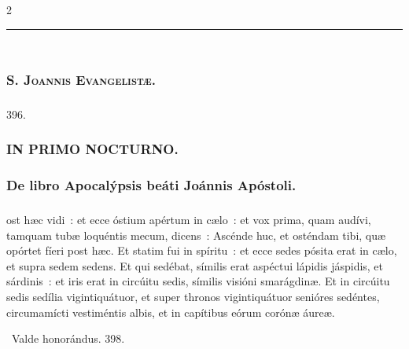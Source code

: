 \documentclass[9pt,twoside]{extarticle}
\begin{document}
\begin{multicols}{2}
\begin{center}\textcolor{red}{\rule{\linewidth}{0.5pt}} \end{center}

\subsection*{\center {}}
\subsubsection*{\center {}\\ \textsc{S. Joannis Evangelistæ.}}
\subsubsection*{\center {}}

\begin{tightlist}{}
\item {} 396. 
\end{tightlist}
\subsubsection*{\center \textsc{IN PRIMO NOCTURNO.}}
\subsubsection*{\center De libro Apocalýpsis beáti Joánnis Apóstoli.}
\subsubsection*{\center {}}
ost hæc vidi~: et ecce óstium apértum in cælo~: et vox prima, quam audívi, tamquam tubæ loquéntis mecum, dicens~: Ascénde huc, et osténdam tibi, quæ opórtet fíeri post hæc.
Et statim fui in spíritu~: et ecce sedes pósita erat in cælo, et supra sedem sedens.
Et qui sedébat, símilis erat aspéctui lápidis jáspidis, et sárdinis~: et iris erat in circúitu sedis, símilis visióni smarágdinæ.
Et in circúitu sedis sedília vigintiquátuor, et super thronos vigintiquátuor senióres sedéntes, circumamícti vestiméntis albis, et in capítibus eórum corónæ áureæ.

\begin{tightlist}{}
\item {}~Valde honorándus. 398.
\end{tightlist}


\end{multicols}
\end{document}
